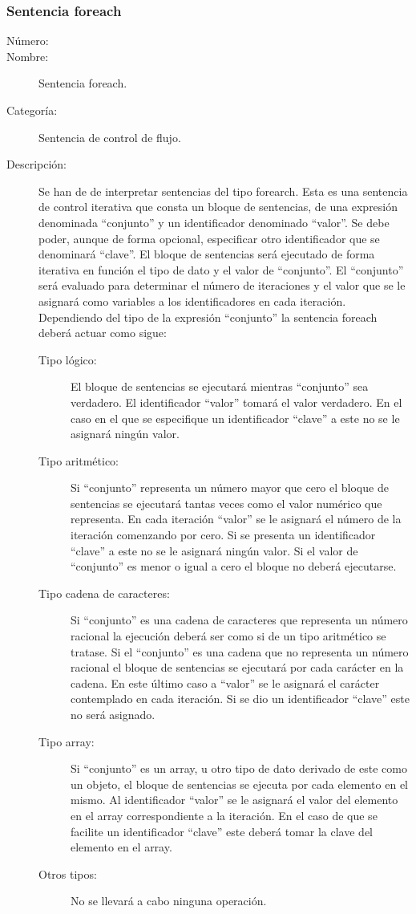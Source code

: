 \subsubsection{Sentencia foreach}
	\begin{description}
		\item [Número:] \cn
		\item [Nombre:] Sentencia foreach.
		\item [Categoría:] Sentencia de control de flujo.
		\item [Descripción:] Se han de de interpretar sentencias del tipo forearch. Esta es una sentencia de control
		iterativa que consta un bloque de sentencias, de una expresión denominada ``conjunto'' y  un identificador denominado ``valor''.
		Se debe poder, aunque de forma opcional, especificar otro identificador que se denominará ``clave''.
		El bloque de sentencias será ejecutado de forma iterativa en función el tipo de dato y el valor de ``conjunto''.  El ``conjunto''
		será evaluado para determinar el número de iteraciones y el valor que se le asignará como variables a los identificadores en
		cada iteración. Dependiendo del tipo de la expresión ``conjunto'' la sentencia foreach deberá actuar como sigue:
		
		\begin{description}
			\item [Tipo lógico:] El bloque de sentencias se ejecutará mientras ``conjunto'' sea verdadero. El identificador ``valor'' tomará
			el valor verdadero. En el caso en el que se especifique un identificador ``clave'' a este no se le asignará ningún valor.
			\item [Tipo aritmético:] Si ``conjunto'' representa un número mayor que cero el bloque de sentencias se ejecutará
			tantas veces como el valor numérico que representa. En cada iteración ``valor'' se le asignará el número de la iteración
			comenzando por cero. Si se presenta un identificador ``clave'' a este no se le asignará ningún valor.
			Si el valor de ``conjunto'' es menor o igual a cero el bloque no deberá ejecutarse.
			\item [Tipo cadena de caracteres:] Si ``conjunto'' es una cadena de caracteres que representa un número racional la
			ejecución deberá ser como si de un tipo aritmético se tratase. Si el ``conjunto'' es una cadena que no representa un número racional
			el bloque de sentencias se ejecutará por cada carácter en la cadena. En este último caso a ``valor'' se le asignará el carácter
			contemplado en cada iteración. Si se dio un identificador ``clave'' este no será asignado.
			\item [Tipo array:] Si ``conjunto'' es un array, u otro tipo de dato derivado de este como un objeto, el bloque de sentencias
			se ejecuta por cada elemento en el mismo. Al identificador ``valor'' se le asignará el valor del elemento en el array correspondiente
			a la iteración. En el caso de que se facilite un identificador ``clave'' este deberá tomar la clave del elemento en el array.
			\item [Otros tipos:] No se llevará a cabo ninguna operación.
		\end{description}
	\end {description}
